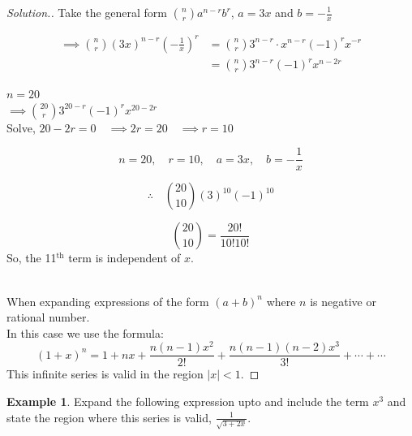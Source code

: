 \documentclass[11pt,a4paper]{article}
\theoremstyle{definition}
\newtheorem{example}[thm]{Example}
\newenvironment{solution}
  {\renewcommand{\qedsymbol}{}\begin{proof}[\textit{Solution}.]}
  {\end{proof}}
\begin{document}
\begin{solution}

Take the general form $
\binom{n}{r}
a^{n-r}b^r
$, \quad  $a=3x$ and $b=-\frac{1}{x}$

\begin{align*}
\implies 
\binom{n}{r}
(3x)^{n-r}\left(-\frac{1}{x}\right)^r & = 
\binom{n}{r}
3^{n-r}\cdot x^{n-r}(-1)^r x^{-r}\\
& = 
\binom{n}{r}
3^{n-r}(-1)^r x^{n-2r}
\end{align*}

$n=20$\\

$\implies 
\binom{20}{r}
3^{20-r}(-1)^rx^{20-2r}
$\\

Solve, $20-2r=0\quad  \implies 2r=20\quad  \implies r=10$

$$n=20,\quad  r=10,\quad  a=3x,\quad  b=-\frac{1}{x}$$

$$\therefore \quad 
\binom{20}{10}
(3)^{10}(-1)^{10}
$$

$$
\binom{20}{10}
=\frac{20!}{10!10!}
$$
So, the 11$^{\text{th}}$ term is independent of $x$.\\\\

\vspace{0.5cm}






When expanding expressions of the form $(a+b)^n$ where $n$ is negative or rational number.\\

In this case we use the formula:
$$(1+x)^n=1 + nx +\frac{n(n-1)x^2}{2!}+\frac{n(n-1)(n-2)x^3}{3!}+\cdots +\cdots$$
This infinite series is valid in the region $|x|<1$.
\end{solution}
\begin{example}

Expand the following expression upto and include the term $x^3$ and state the region where this series is valid, $\frac{1}{\sqrt{3+2x}}$.
\end{example}
\end{document}
